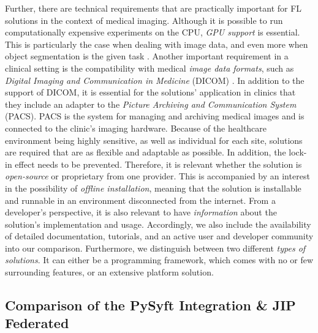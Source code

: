 Further, there are technical requirements that are practically important for FL solutions in the context of medical imaging.
Although it is possible to run computationally expensive experiments on the CPU, \textit{GPU support} is essential. This is particularly the case when dealing with image data, and even more when object segmentation is the given task \citep{Kaissis2021End-to-endImaging, Lee2021FederatedEnvironment}.
Another important requirement in a clinical setting is the  compatibility with medical \textit{image data formats}, such as \textit{Digital Imaging and Communication in Medicine} (DICOM) \citep{Kaissis2021End-to-endImaging}.
In addition to the support of DICOM, it is essential for the solutions' application in clinics that they  include an adapter to the \textit{Picture Archiving and Communication System} (PACS). PACS is the system for managing and archiving medical images and is connected to the clinic's imaging hardware.
Because of the healthcare environment being highly sensitive, as well as individual for each site, solutions are required that are as flexible and adaptable as possible. In addition, the lock-in effect needs to be prevented. Therefore, it is relevant whether the solution is \textit{open-source} or proprietary from one provider.
This is accompanied by an interest in the possibility of \textit{offline installation}, meaning that the solution is installable and runnable in an environment disconnected from the internet.
From a developer's perspective, it is also relevant to have \textit{information} about the solution's implementation and usage. Accordingly, we also include the availability of detailed documentation, tutorials, and an active user and developer community into our comparison.
Furthermore, we distinguish between two different \textit{types of solutions}. It can either be a programming framework, which comes with no or few surrounding features, or an extensive platform solution.






\subsection{Comparison of the PySyft Integration \& JIP Federated}
\label{subsec:ResultsRuntime}

